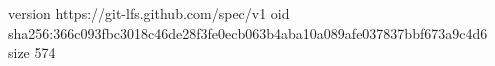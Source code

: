 version https://git-lfs.github.com/spec/v1
oid sha256:366c093fbc3018c46de28f3fe0ecb063b4aba10a089afe037837bbf673a9c4d6
size 574
